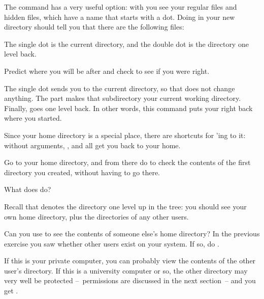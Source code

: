 The  command has a very useful option: with  you see
your regular files and hidden files, which have a name that starts
with a dot. Doing  in your new directory should tell you that
there are the following files:


The single dot is the
current directory, and the double dot is the directory one level
back. 

\begin{exercise}
  Predict where you will be after   and check to
  see if you were right.
\end{exercise}
\begin{outcome}
  The single dot sends you to the current directory, so that does not
  change anything. The  part makes that subdirectory your
  current working directory. Finally,  goes one level back. In
  other words, this command puts your right back where you started.
\end{outcome}

Since your home directory is a special place, there are shortcuts for
'ing to it:  without arguments, , and 
  all get you back to your home.

Go to your home directory, and from there do  to check
the contents of the first directory you created, without having to go
there.

\begin{exercise}
  What does  do?
\end{exercise}
\begin{outcome}
  Recall that  denotes the directory one level up in the tree:
  you should see your own home directory, plus the directories of any
  other users.
\end{outcome}

\begin{exercise}
  Can you use  to see the contents of someone else's home
  directory? In the previous exercise you saw whether other users
  exist on your system. If so, do .
\end{exercise}
\begin{outcome}
  If this is your private computer, you can probably view the contents
  of the other user's directory. If this is a university computer or
  so, the other directory may very well be protected --~permissions
  are discussed in the next section~-- and
  you get .
\end{outcome}

